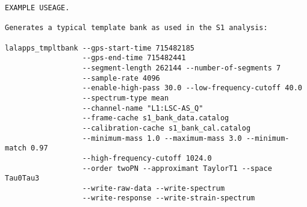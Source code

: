 \begin{verbatim}
EXAMPLE USEAGE.

Generates a typical template bank as used in the S1 analysis:

lalapps_tmpltbank --gps-start-time 715482185 
                  --gps-end-time 715482441 
                  --segment-length 262144 --number-of-segments 7 
                  --sample-rate 4096 
                  --enable-high-pass 30.0 --low-frequency-cutoff 40.0 
                  --spectrum-type mean 
                  --channel-name "L1:LSC-AS_Q" 
                  --frame-cache s1_bank_data.catalog 
                  --calibration-cache s1_bank_cal.catalog 
                  --minimum-mass 1.0 --maximum-mass 3.0 --minimum-match 0.97 
                  --high-frequency-cutoff 1024.0 
                  --order twoPN --approximant TaylorT1 --space Tau0Tau3 
                  --write-raw-data --write-spectrum 
                  --write-response --write-strain-spectrum
\end{verbatim}

%
%
%
%
%
%
%

